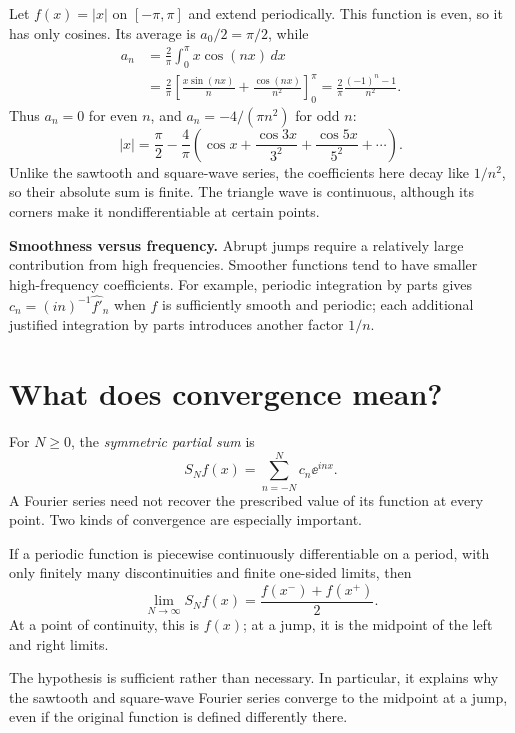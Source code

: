 \begin{example}[Triangle wave: $f(x)=|x|$]
Let $f(x)=|x|$ on $[-\pi,\pi]$ and extend periodically. This function is even,
so it has only cosines. Its average is $a_0/2=\pi/2$, while
\begin{align*}
 a_n&=\frac{2}{\pi}\int_0^\pi x\cos(nx)\,dx\\
 &=\frac{2}{\pi}\left[
 \frac{x\sin(nx)}n+\frac{\cos(nx)}{n^2}\right]_0^\pi
 =\frac{2}{\pi}\frac{(-1)^n-1}{n^2}.
\end{align*}
Thus $a_n=0$ for even $n$, and $a_n=-4/(\pi n^2)$ for odd $n$:
\begin{equation}\label{eq:triangle}
 \boxed{|x|=\frac{\pi}{2}-\frac4\pi\left(
 \cos x+\frac{\cos3x}{3^2}+\frac{\cos5x}{5^2}+\cdots\right).}
\end{equation}
Unlike the sawtooth and square-wave series, the coefficients here decay like
$1/n^2$, so their absolute sum is finite. The triangle wave is continuous,
although its corners make it nondifferentiable at certain points.
\end{example}

\begin{remark}
\textbf{Smoothness versus frequency.} Abrupt jumps require a relatively large
contribution from high frequencies. Smoother functions tend to have smaller
high-frequency coefficients. For example, periodic integration by parts gives
$c_n=(in)^{-1}\widehat{f'}_n$ when $f$ is sufficiently smooth and periodic;
each additional justified integration by parts introduces another factor $1/n$.
\end{remark}

\section{What does convergence mean?}\label{sec:convergence}
For $N\geq0$, the \emph{symmetric partial sum} is
\[
 S_Nf(x)=\sum_{n=-N}^{N}c_n\ee^{inx}.
\]
A Fourier series need not recover the prescribed value of its function at
every point. Two kinds of convergence are especially important.

\begin{theorem}\label{thm:dirichlet}
If a periodic function is piecewise continuously differentiable on a period,
with only finitely many discontinuities and finite one-sided limits, then
\begin{equation}\label{eq:dirichlet}
 \lim_{N\to\infty} S_Nf(x)=\frac{f(x^-)+f(x^+)}{2}.
\end{equation}
At a point of continuity, this is $f(x)$; at a jump, it is the midpoint
of the left and right limits.
\end{theorem}
The hypothesis is sufficient rather than necessary. In particular, it
explains why the sawtooth and square-wave Fourier series converge to the
midpoint at a jump, even if the original function is defined differently there.


